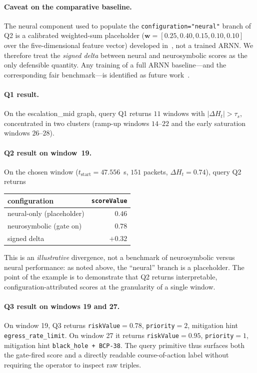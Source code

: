 \documentclass[runningheads]{llncs}
\newcommand{\EntropyDeviation}{\ensuremath{\Delta H}}
\newcommand{\taus}{\ensuremath{\tau_{s}}}
\begin{document}
\paragraph{Caveat on the comparative baseline.} The neural component
used to populate the \texttt{configuration="neural"} branch of Q2 is a
calibrated weighted-sum placeholder
($\mathbf{w} = [0.25, 0.40, 0.15, 0.10, 0.10]$ over the
five-dimensional feature vector) developed in~\cite{vartic2026}, not
a trained ARNN. We therefore treat the \emph{signed delta} between
neural and neurosymbolic scores as the only defensible quantity. Any
training of a full ARNN baseline---and the corresponding fair
benchmark---is identified as future work~\cite{paper5}.

\paragraph{Q1 result.} On the escalation\_mid graph, query Q1 returns
$11$ windows with $|\EntropyDeviation_t| > \taus$, concentrated in two clusters
(ramp-up windows $14$--$22$ and the early saturation windows $26$--$28$).

\paragraph{Q2 result on window~19.} On the chosen window
($t_{\mathrm{start}} = 47.556$~s, $151$ packets, $\EntropyDeviation_t = 0.74$), query
Q2 returns

\begin{center}
\begin{tabular}{@{}lr@{}}
\toprule
configuration  & \texttt{scoreValue} \\
\midrule
neural-only (placeholder) & $0.46$ \\
neurosymbolic (gate on)   & $0.78$ \\
\midrule
signed delta              & $+0.32$ \\
\bottomrule
\end{tabular}
\end{center}

This is an \emph{illustrative} divergence, not a benchmark of
neurosymbolic versus neural performance: as noted above, the
``neural'' branch is a placeholder. The point of the example is to
demonstrate that Q2 returns interpretable, configuration-attributed
scores at the granularity of a single window.

\paragraph{Q3 result on windows 19 and 27.} On window 19, Q3 returns
\texttt{riskValue}$=0.78$, \texttt{priority}$=2$, mitigation hint
\texttt{egress\_rate\_limit}. On window 27 it returns
\texttt{riskValue}$=0.95$, \texttt{priority}$=1$, mitigation hint
\texttt{black\_hole + BCP-38}. The query primitive thus surfaces both
the gate-fired score and a directly readable course-of-action label
without requiring the operator to inspect raw triples.
\end{document}

